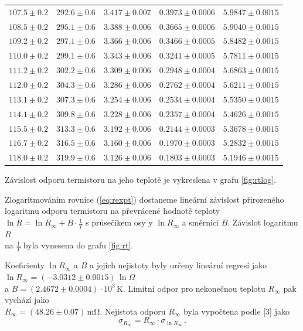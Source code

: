 \documentclass{../concepts/prepareprotokol} %
\begin{document}
\begin{table}[hbtp]
\begin{tabular}{ccccc}
 $107.5 \pm 0.2$ & $292.6 \pm 0.6$ & $3.417 \pm 0.007$ & $0.3973 \pm 0.0006$ & $5.9847 \pm 0.0015$ \\
 $108.5 \pm 0.2$ & $295.1 \pm 0.6$ & $3.388 \pm 0.006$ & $0.3665 \pm 0.0006$ & $5.9040 \pm 0.0015$ \\
 $109.2 \pm 0.2$ & $297.1 \pm 0.6$ & $3.366 \pm 0.006$ & $0.3466 \pm 0.0005$ & $5.8482 \pm 0.0015$ \\
 $110.0 \pm 0.2$ & $299.1 \pm 0.6$ & $3.343 \pm 0.006$ & $0.3241 \pm 0.0005$ & $5.7811 \pm 0.0015$ \\
 $111.2 \pm 0.2$ & $302.2 \pm 0.6$ & $3.309 \pm 0.006$ & $0.2948 \pm 0.0004$ & $5.6863 \pm 0.0015$ \\
 $112.0 \pm 0.2$ & $304.3 \pm 0.6$ & $3.286 \pm 0.006$ & $0.2762 \pm 0.0004$ & $5.6211 \pm 0.0015$ \\
 $113.1 \pm 0.2$ & $307.3 \pm 0.6$ & $3.254 \pm 0.006$ & $0.2534 \pm 0.0004$ & $5.5350 \pm 0.0015$ \\
 $114.1 \pm 0.2$ & $309.8 \pm 0.6$ & $3.228 \pm 0.006$ & $0.2357 \pm 0.0004$ & $5.4626 \pm 0.0015$ \\
 $115.5 \pm 0.2$ & $313.3 \pm 0.6$ & $3.192 \pm 0.006$ & $0.2144 \pm 0.0003$ & $5.3678 \pm 0.0015$ \\
 $116.7 \pm 0.2$ & $316.5 \pm 0.6$ & $3.160 \pm 0.006$ & $0.1970 \pm 0.0003$ & $5.2832 \pm 0.0015$ \\
 $118.0 \pm 0.2$ & $319.9 \pm 0.6$ & $3.126 \pm 0.006$ & $0.1803 \pm 0.0003$ & $5.1946 \pm 0.0015$ \\
 \bottomrule
\end{tabular}
\label{tab:rt}
\end{table}

Závislost odporu termistoru na jeho teplotě je vykreslena v grafu \ref{fig:rtlog}. 

Zlogaritmováním rovnice (\ref{eq:rexpt}) dostaneme lineární závislost přirozeného logaritmu odporu termistoru na převrácené hodnotě teploty $\ln{R} = \ln{R_\infty} + B \cdot \frac{1}{T}$ s průsečíkem osy y $\ln{R_\infty}$ a směrnicí $B$. Závislot logaritmu $R$ \\ na $\frac{1}{T}$ byla vynesena do grafu \ref{fig:rt}.

Koeficienty $\ln{R_\infty}$ a $B$ a jejich nejistoty byly určeny lineární regresí jako $\ln{R_\infty} = (-3.0312 \pm 0.0015) \, \ln{\Omega}$ \\ a $B = (2.4672 \pm 0.0004) \cdot 10^3 \, \si{\kelvin}$. Limitní odpor pro nekonečnou teplotu $R_\infty$ pak vychází jako \\ $R_\infty = (48.26 \pm 0.07) \, \si{\milli \ohm}$. Nejistota odporu $R_\infty$ byla vypočtena podle [3] jako
\begin{equation}
    \sigma_{R_\infty} = R_\infty \cdot \sigma_{\ln{R_\infty}} \, .
\end{equation}
\end{document}
